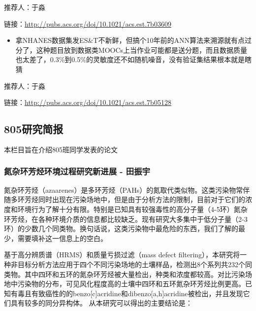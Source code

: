 \documentclass[]{book}
\providecommand{\tightlist}{%
  \setlength{\itemsep}{0pt}\setlength{\parskip}{0pt}}
\begin{document}
推荐人：于淼

链接：\url{http://pubs.acs.org/doi/10.1021/acs.est.7b03609}

\begin{itemize}
\tightlist
\item
  拿NHANES数据集发ES\&T不新鲜，但搞个10年前的ANN算法来溯源就有点过分了，这种题目放到数据类MOOCs上当作业可能都是送分题，而且数据质量也太差了，0.3\%到0.5\%的灵敏度还不如随机噪音，没有验证集结果根本就是瞎猜
\end{itemize}

推荐人：于淼

链接：\url{http://pubs.acs.org/doi/10.1021/acs.est.7b05128}

\hypertarget{ux7814ux7a76ux7b80ux62a5-1}{%
\subsection*{805研究简报}\label{ux7814ux7a76ux7b80ux62a5-1}}

本栏目旨在介绍805班同学发表的论文

\hypertarget{ux6c2eux6742ux73afux82b3ux70c3ux73afux5883ux8fc7ux7a0bux7814ux7a76ux65b0ux8fdbux5c55---ux7530ux632fux5b87}{%
\subsubsection*{氮杂环芳烃环境过程研究新进展 - 田振宇}\label{ux6c2eux6742ux73afux82b3ux70c3ux73afux5883ux8fc7ux7a0bux7814ux7a76ux65b0ux8fdbux5c55---ux7530ux632fux5b87}}

氮杂环芳烃（azaarenes）是多环芳烃（PAHs）的氮取代类似物。这类污染物常伴随多环芳烃同时出现在污染场地中，但是由于分析方法的限制，目前对于它们的浓度和环境行为了解十分有限。特别是已知具有较强毒性的高分子量（4-5环）氮杂环芳烃，在各种环境介质的信息都比较缺乏。现有研究大多集中于低分子量（2-3环）的少数几个同类物。换句话说，这类污染物中最危险的东西，我们了解的最少，需要填补这一信息上的空白。

基于高分辨质谱（HRMS）和质量亏损过滤（mass defect filtering），本研究将一种非目标分析方法应用于四个不同污染场地的土壤样品，检测出8个系列共232个同类物。其中四环和五环的氮杂环芳烃被大量检出，种类和浓度都较高。对比污染场地中污染物的分布，可见风化程度高的土壤中四环和五环氮杂环芳烃比例更高。已知有毒且有致癌性的的benzo{[}c{]}acridine和dibenzo{[}a,h{]}acridine被检出，并且发现它们具有较多的同分异构体。
从本研究可以得出的主要结论是：
\end{document}
